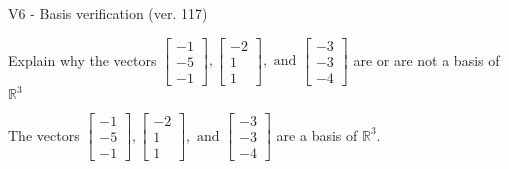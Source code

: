 \begin{exercise}
  \begin{exerciseTitle}V6 - Basis verification (ver. 117)\end{exerciseTitle}
  \begin{exerciseStatement}
    Explain why the vectors \(\left[\begin{array}{r}
-1 \\
-5 \\
-1
\end{array}\right] , \left[\begin{array}{r}
-2 \\
1 \\
1
\end{array}\right] , \text{ and } \left[\begin{array}{r}
-3 \\
-3 \\
-4
\end{array}\right]\) are or are not a basis of \(\mathbb{R}^3\)	


  \end{exerciseStatement}
  \begin{exerciseAnswer}
   The vectors \(\left[\begin{array}{r}
-1 \\
-5 \\
-1
\end{array}\right] , \left[\begin{array}{r}
-2 \\
1 \\
1
\end{array}\right] , \text{ and } \left[\begin{array}{r}
-3 \\
-3 \\
-4
\end{array}\right]\) 
  	 are  a basis of \(\mathbb{R}^3\).
  


  \end{exerciseAnswer}
\end{exercise}